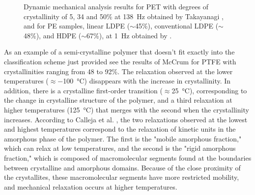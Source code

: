 \begin{figure}[htbp]
\begin{subfigure}[b]{0.45\textwidth}
                        \caption{}
                        \label{subfig:pe_dma}
        \end{subfigure}
    \caption{Dynamic mechanical analysis results for  PET with degrees of crystallinity of 5, 34 and 50\% at \SI{138}{\hertz} obtained by Takayanagi \citep{wardIntroductionMechanicalProperties2004}, and for  PE samples, linear LDPE ($\sim$45\%), conventional LDPE ($\sim$48\%), and HDPE ($\sim$67\%), at \SI{1}{\hertz} obtained by \cite{khannaDynamicMechanicalRelaxations1985}.}
\label{fig:dma_cryst}
\end{figure}

As an example of a semi-crystalline polymer that doesn't fit exactly into the classification scheme just provided see the results of McCrum \cite{mccrumStudyInternalFriction1959} for PTFE with crystallinities ranging from 48 to 92\%.
The relaxation observed at the lower temperatures ($\approx$\SI{-100}{\celsius}) disappears with the increase in crystallinity.
In addition, there is a crystalline first-order transition ($\approx$\SI{25}{\celsius}), corresponding to the change in crystalline structure of the polymer, and a third relaxation at higher temperatures (\SI{125}{\celsius}) that merges with the second when the crystallinity increases.
According to Calleja et al. \citep{callejaWhereGlassTransition2013}, the two relaxations observed at the lowest and highest temperatures correspond to the relaxation of kinetic units in the amorphous phase of the polymer.
The first is the "mobile amorphous fraction," which can relax at low temperatures, and the second is the "rigid amorphous fraction," which is composed of macromolecular segments found at the boundaries between crystalline and amorphous domains.
Because of the close proximity of the crystallites, these macromolecular segments have more restricted mobility, and mechanical relaxation occurs at higher temperatures.

\enlargethispage{\baselineskip}



